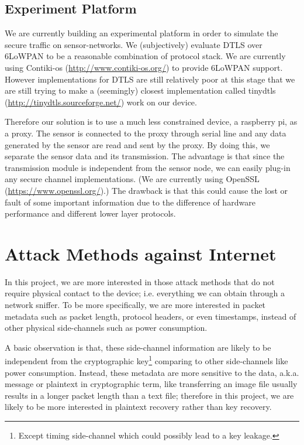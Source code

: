 \subsection{Experiment Platform}
We are currently building an experimental platform in order to simulate the secure traffic on sensor-networks. We (subjectively) evaluate DTLS over 6LoWPAN to be a reasonable combination of protocol stack. We are currently using Contiki-os (\url{http://www.contiki-os.org/}) to provide 6LoWPAN support.  However implementations for DTLS are still relatively poor at this stage that we are still trying to make a (seemingly) closest implementation called tinydtls (\url{http://tinydtls.sourceforge.net/}) work on our device.

Therefore our solution is to use a much less constrained device, a raspberry pi, as a proxy. The sensor is connected to the proxy through serial line and any data generated by the sensor are read and sent by the proxy. By doing this, we separate the sensor data and its transmission. The advantage is that since the transmission module is independent from the sensor node, we can easily plug-in any secure channel implementations. (We are currently using OpenSSL (\url{https://www.openssl.org/}).) The drawback is that this could cause the lost or fault of some important information due to the difference of hardware performance and different lower layer protocols.

\section{Attack Methods against Internet}

In this project, we are more interested in those attack methods that do not require physical contact to the device; i.e. everything we can obtain through a network sniffer. To be more specifically, we are more interested in packet metadata such as packet length, protocol headers, or even timestamps, instead of other physical side-channels such as power consumption.

A basic observation is that, these side-channel information are likely to be independent from the cryptographic key\footnote{ Except timing side-channel which could possibly lead to a key leakage.\cite{Cache-Timing1}} comparing to other side-channels like power consumption\cite{DPA}. Instead, these metadata are more sensitive to the data, a.k.a. message or plaintext in cryptographic term, like transferring an image file usually results in a longer packet length than a text file; therefore in this project, we are likely to be more interested in plaintext recovery rather than key recovery.

